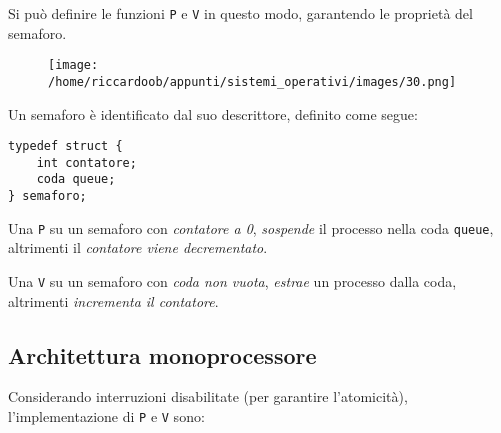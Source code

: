 Si può definire le funzioni \texttt{P} e \texttt{V} in questo modo, garantendo le proprietà del semaforo.

\begin{figure}[H]
    \centering
    \texttt{[image: /home/riccardoob/appunti/sistemi\_operativi/images/30.png]}
\end{figure}

Un semaforo è identificato dal suo descrittore, definito come segue:
\begin{verbatim}
typedef struct {
    int contatore;
    coda queue;
} semaforo;
\end{verbatim}

Una \texttt{P} su un semaforo con \textit{contatore a 0}, \textit{sospende} il processo nella coda \texttt{queue}, altrimenti il \textit{contatore viene decrementato}.

Una \texttt{V} su un semaforo con \textit{coda non vuota}, \textit{estrae} un processo dalla coda, altrimenti \textit{incrementa il contatore}.

\subsection{Architettura monoprocessore}
Considerando interruzioni disabilitate (per garantire l'atomicità), l'implementazione di \texttt{P} e \texttt{V} sono:


